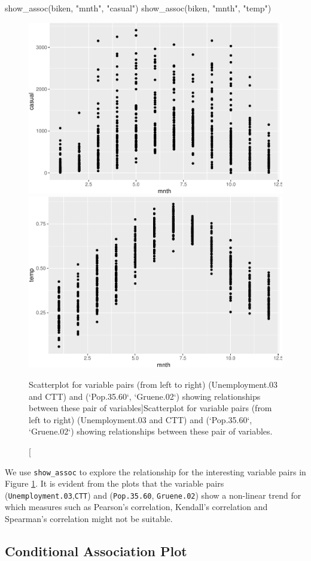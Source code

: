 \begin{Schunk}
\begin{Sinput}
show_assoc(biken, "mnth", "casual")
show_assoc(biken, "mnth", "temp")
\end{Sinput}
\begin{figure}
\includegraphics[width=0.5\linewidth]{rj_paper_files/figure-latex/int-pairs-multiple-germanelection-1} \includegraphics[width=0.5\linewidth]{rj_paper_files/figure-latex/int-pairs-multiple-germanelection-2} \caption[Scatterplot for variable pairs (from left to right) (Unemployment.03 and CTT) and (`Pop.35.60`, `Gruene.02`) showing relationships between these pair of variables]{Scatterplot for variable pairs (from left to right) (Unemployment.03 and CTT) and (`Pop.35.60`, `Gruene.02`) showing relationships between these pair of variables.}\label{fig:int-pairs-multiple-germanelection}
\end{figure}
\end{Schunk}

We use \texttt{show\_assoc} to explore the relationship for the
interesting variable pairs in Figure
\ref{fig:int-pairs-multiple-germanelection}. It is evident from the
plots that the variable pairs (\texttt{Unemployment.03},\texttt{CTT})
and (\texttt{Pop.35.60}, \texttt{Gruene.02}) show a non-linear trend for
which measures such as Pearson's correlation, Kendall's correlation and
Spearman's correlation might not be suitable.

\hypertarget{conditional-association-plot}{%
\subsection{Conditional Association
Plot}\label{conditional-association-plot}}

